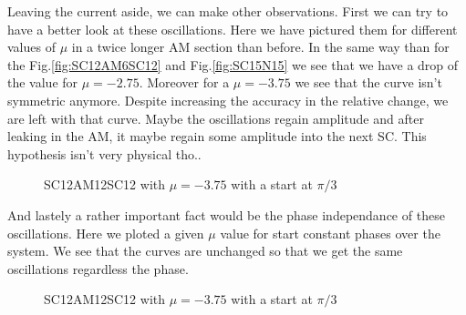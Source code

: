 \documentclass[../main.tex]{subfiles}
\begin{document}
Leaving the current aside, we can make other observations. First we can try to have a better look at these oscillations. Here we have pictured them for different values of $\mu$ in a 
twice longer AM section than before. In the same way than for the Fig.\ref{fig:SC12AM6SC12} and Fig.\ref{fig:SC15N15} we see that we have a drop of the value for $\mu = -2.75$.
Moreover for a $\mu = -3.75$ we see that the curve isn't symmetric anymore. Despite increasing the accuracy in the relative change, we are left with that curve. Maybe the 
oscillations regain amplitude and after leaking in the AM, it maybe regain some amplitude into the next SC. This hypothesis isn't very physical tho..
\begin{figure}[H]
    \centering
    
    \caption{SC12AM12SC12 with $\mu=-3.75$ with a start at $\pi/3$}
\end{figure}

And lastely a rather important fact would be the phase independance of these oscillations. Here we ploted a given $\mu$ value for start constant phases over the system. We see that the
curves are unchanged so that we get the same oscillations regardless the phase. 
\begin{figure}[H]
    \centering
    
    \caption{SC12AM12SC12 with $\mu=-3.75$ with a start at $\pi/3$}
\end{figure}
\end{document}
